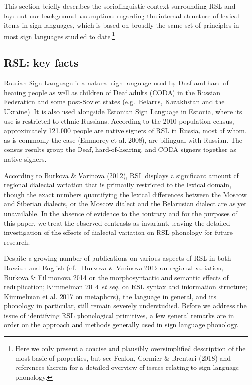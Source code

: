 This section briefly describes the sociolinguistic context surrounding
RSL and lays out our background assumptions regarding the internal
structure of lexical items in sign languages, which is based on broadly
the same set of principles in most sign languages studied to
date.\footnote{Here we only present a concise and plausibly
  oversimplified description of the most basic of properties, but see
  Fenlon, Cormier \& Brentari (2018) and references therein for a
  detailed overview of issues relating to sign language phonology.}

\hypertarget{sec:rsl-key-facts}{%
\subsection{RSL: key facts}\label{sec:rsl-key-facts}}

Russian Sign Language is a natural sign language used by Deaf and
hard-of-hearing people as well as children of Deaf adults (CODA) in the
Russian Federation and some post-Soviet states (e.g.~Belarus, Kazakhstan
and the Ukraine). It is also used alongside Estonian Sign Language in
Estonia, where its use is restricted to ethnic Russians. According to
the 2010 population census, approximately 121,000 people are native
signers of RSL in Russia, most of whom, as is commonly the case (Emmorey
et al. 2008), are bilingual with Russian. The census results group the
Deaf, hard-of-hearing, and CODA signers together as native signers.

According to Burkova \& Varinova (2012), RSL displays a significant
amount of regional dialectal variation that is primarily restricted to
the lexical domain, though the exact numbers quantifying the lexical
differences between the Moscow and Siberian dialects, or the Moscow
dialect and the Belarusian dialect are as yet unavailable. In the
absence of evidence to the contrary and for the purposes of this paper,
we treat the observed contrasts as invariant, leaving the detailed
investigation of the effects of dialectal variation on RSL phonology for
future research.

Despite a growing number of publications on various aspects of RSL in
both Russian and English (cf.~ Burkova \& Varinova 2012 on regional
variation; Burkova \& Filimonova 2014 on the morphosyntactic and
semantic effects of reduplication; Kimmelman 2014 \emph{et seq.} on RSL
syntax and information structure; Kimmelman et al. 2017 on metaphors),
the language in general, and its phonology in particular, still remain
severely understudied. Before we address the issue of identifying RSL
phonological primitives, a few general remarks are in order on the
approach and methods generally used in sign language phonology.

